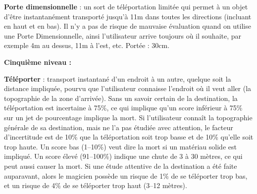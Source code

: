 \bigskip

\label{sort-porte-dimensionnelle}\textbf{Porte dimensionnelle} : un sort de téléportation limitée qui permet à un objet d'être instantanément transporté jusqu'à 11m dans toutes les directions (incluant en haut et en bas). Il n'y a pas de risque de mauvaise évaluation quand on utilise une Porte Dimensionnelle, ainsi l'utilisateur arrive toujours où il souhaite, par exemple 4m au dessus, 11m à l'est, etc. Portée : 30cm.

\bigskip

\textbf{Cinquième niveau :}

\bigskip

\label{sort-teleporter}\textbf{Téléporter} : transport instantané d'un endroit à un autre, quelque soit la distance impliquée, pourvu que l'utilisateur connaisse l'endroit où il veut aller (la topographie de la zone d'arrivée). Sans un savoir certain de la destination, la téléportation est incertaine à 75\%, ce qui implique qu'un score inférieur à 75\% sur un jet de pourcentage implique la mort. Si l'utilisateur connaît la topographie générale de sa destination, mais ne l'a pas étudiée avec attention, le facteur d'incertitude est de 10\% que la téléportation soit trop basse et de 10\% qu'elle soit trop haute. Un score bas (1--10\%) veut dire la mort si un matériau solide est impliqué. Un score élevé (91--100\%) indique une chute de 3 à 30 mètres, ce qui peut aussi causer la mort. Si une étude attentive de la destination a été faite auparavant, alors le magicien possède un risque de 1\% de se téléporter trop bas, et un risque de 4\% de se téléporter trop haut (3--12 mètres).

\bigskip

